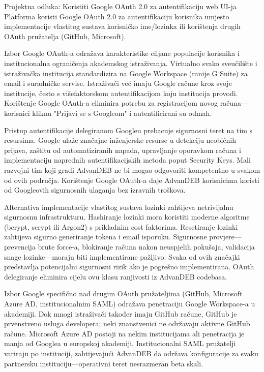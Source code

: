\documentclass[12pt,a4paper]{article}
\begin{document}
\begin{rationale}{Projektna odluka: Koristiti Google OAuth 2.0 za autentifikaciju web UI-ja}
Platforma koristi Google OAuth 2.0 za autentifikaciju korisnika umjesto implementacije vlastitog sustava korisničko ime/lozinka ili korištenja drugih OAuth pružatelja (GitHub, Microsoft).
\end{rationale}

Izbor Google OAuth-a odražava karakteristike ciljane populacije korisnika i institucionalna ograničenja akademskog istraživanja. Virtualno svako sveučilište i istraživačka institucija standardizira na Google Workspace (ranije G Suite) za email i suradničke servise. Istraživači već imaju Google račune kroz svoje institucije, često s višefaktorskom autentifikacijom koju institucija provodi. Korištenje Google OAuth-a eliminira potrebu za registracijom novog računa—korisnici kliknu "Prijavi se s Googleom" i autentificirani su odmah.

Pristup autentifikacije delegiranom Googleu prebacuje sigurnosni teret na tim s resursima. Google ulaže značajne inženjerske resurse u detekciju neobičnih prijava, zaštitu od automatiziranih napada, upravljanje oporavkom računa i implementaciju naprednih autentifikacijskih metoda poput Security Keys. Mali razvojni tim koji gradi AdvanDEB ne bi mogao odgovoriti kompetentno u svakom od ovih područja. Korištenje Google OAuth-a daje AdvanDEB korisnicima koristi od Googleovih sigurnosnih ulaganja bez izravnih troškova.

Alternativa implementacije vlastitog sustava lozinki zahtijeva netrivijalnu sigurnosnu infrastrukturu. Hashiranje lozinki mora koristiti moderne algoritme (bcrypt, scrypt ili Argon2) s prikladnim cost faktorima. Resetiranje lozinki zahtijeva sigurno generiranje tokena i email isporuku. Sigurnosne provjere—prevencija brute force-a, blokiranje računa nakon neuspjelih pokušaja, validacija snage lozinke—moraju biti implementirane pažljivo. Svaka od ovih značajki predstavlja potencijalni sigurnosni rizik ako je pogrešno implementirana. OAuth delegiranje eliminira cijelu ovu klasu ranjivosti iz AdvanDEB codebasa.

Izbor Google specifično nad drugim OAuth pružateljima (GitHub, Microsoft Azure AD, institucionalnim SAML) odražava penetraciju Google Workspace-a u akademiji. Dok mnogi istraživači također imaju GitHub račune, GitHub je prvenstveno usluga developera; neki znanstvenici ne održavaju aktivne GitHub račune. Microsoft Azure AD postoji na nekim institucijama ali penetracija je manja od Googlea u europskoj akademiji. Institucionalni SAML pružatelji variraju po instituciji, zahtijevajući AdvanDEB da održava konfiguracije za svaku partnersku instituciju—operativni teret nesrazmeran beta skali.
\end{document}
